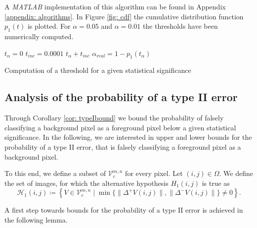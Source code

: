 \documentclass[a4paper,12pt]{article}
\newcommand{\norm}[1]{\lVert#1\rVert}
\theoremstyle{plain}
\theoremstyle{definition}
\numberwithin{equation}{section}
\begin{document}
A \emph{MATLAB} implementation of this algorithm can be found in Appendix \ref{appendix: algorithms}. In Figure \ref{fig: cdf} the cumulative distribution function $p_1(t)$ is plotted. For $\alpha = 0.05$ and $\alpha = 0.01$ the thresholds have been numerically computed.\\

\begin{algorithm}[H]
	$t_\alpha = 0$\;
	$t_{inc} = 0.0001$\;
	{
		$t_\alpha + t_{inc}$\;
		$\alpha_{real} = 1 - p_1(t_\alpha)$\;
	}
	\caption{Computation of a threshold for a given statistical significance}
	\label{alg: threshold}
\end{algorithm}





\subsection{Analysis of the probability of a type II error}\label{section: analyzetypeIIerror}

Through Corollary \eqref{cor: typeIbound} we bound the probability of falsely classifying a background pixel as a foreground pixel below a given statistical significance. In the following, we are interested in upper and lower bounds for the probability of a type II error, that is falsely classifying a foreground pixel as a background pixel.

To this end, we define a subset of $\mathcal{V}_c^{m, n}$ for every pixel. Let $(i, j) \in \Omega$. We define the set of images, for which the alternative hypothesis $H_1(i, j)$ is true as
\begin{equation}\label{setH1}
	\mathcal{H}_1(i, j) \coloneqq \left\{ V \in \mathcal{V}_c^{m, n} \mid \min \{ \norm{\Delta^+ V(i, j)}, \norm{\Delta^- V(i, j)} \} \neq 0 \right\}.
\end{equation}

A first step towards bounds for the probability of a type II error is achieved in the following lemma.
\end{document}
